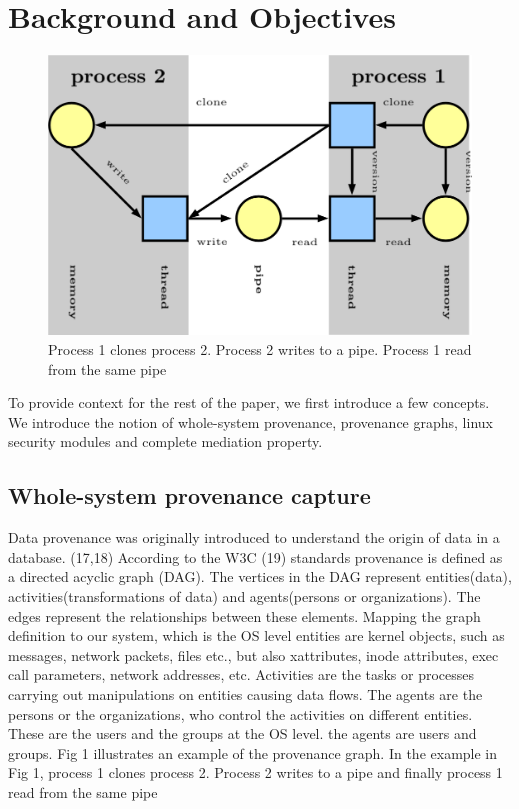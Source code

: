 \section{Background and Objectives}
\begin{figure}
	\centering
	\includegraphics[width=0.7\linewidth]{graph}
	\caption[Provenance graph]{Process 1 clones process 2. Process 2 writes to a pipe. Process 1 read from the same pipe}
	\label{fig:graph}
\end{figure}

To provide context for the rest of the paper, we first introduce a few concepts. We introduce the notion of whole-system provenance, provenance graphs, linux security modules and complete mediation property.

\subsection{Whole-system provenance capture}
Data provenance was originally introduced to understand the origin of data in a database. (17,18) According to the W3C (19) standards provenance is defined as a directed acyclic graph (DAG). The vertices in the DAG represent entities(data), activities(transformations of data) and agents(persons or organizations). The edges represent the relationships between these elements. Mapping the graph definition to our system, which is the OS level entities are kernel objects, such as messages, network packets, files etc., but also xattributes, inode attributes, exec call parameters, network addresses, etc.
Activities are the tasks or processes carrying out manipulations on entities causing data flows. The agents are the persons or the organizations, who control the activities on different entities. These are the users and the groups at the OS level. 
 the agents are users and groups. Fig 1 illustrates an example of the provenance graph. In the example in Fig 1, process 1 clones process 2. Process 2 writes to a pipe and finally process 1 read from the same pipe
\vskip 0.2in 



